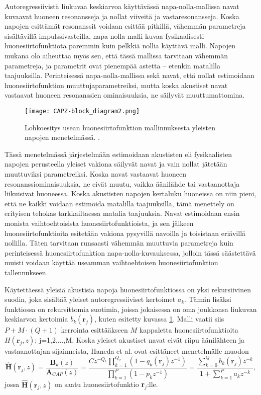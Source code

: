 \documentclass[finnish,12pt]{article}
\begin{document}
Autoregressiivistä liukuvaa keskiarvoa käyttävässä napa-nolla-mallissa navat kuvaavat huoneen resonansseja ja nollat viiveitä ja vastaresonansseja. Koska napojen esittämät resonanssit voidaan esittää pitkillä, vähemmän parametreja sisältävillä impulssivasteilla, napa-nolla-malli kuvaa fysikaalisesti huonesiirtofunktiota paremmin kuin pelkkiä nollia käyttävä malli. Napojen mukana olo aiheuttaa myös sen, että tässä mallissa tarvitaan vähemmän parametreja, ja parametrit ovat pienempää astetta -- etenkin matalilla taajuuksilla. Perinteisessä napa-nolla-mallissa sekä navat, että nollat estimoidaan huonesiirtofunktion muuttujaparametreiksi, mutta koska akustiset navat vastaavat huoneen resonanssien ominaisuuksia, ne säilyvät muuttumattomina. \cite{YHaneda1994} 

\begin{figure}[h!]
\centering
\texttt{[image: CAPZ-block\_diagram2.png]}
\caption{Lohkoesitys usean huonesiirtofunktion mallinnuksesta yleisten napojen menetelmässä. \cite{YHaneda1994}.}
\label{fig:CAPZ block diagram}
\end{figure}

Tässä menetelmässä järjestelmään estimoidaan akustisten eli fysikaalisten napojen perusteella yleiset vakiona säilyvät navat ja vain nollat jätetään muuttuviksi parametreiksi. Koska navat vastaavat huoneen resonanssiominaisuuksia, ne eivät muutu, vaikka äänilähde tai vastaanottaja liikuisivat huoneessa. Koska akustisten napojen kertaluku huoneissa on niin pieni, että ne kaikki voidaan estimoida matalilla taajuuksilla, tämä menettely on erityisen tehokas tarkkailtaessa matalia taajuuksia. Navat estimoidaan ensin monista vaihtoehtoisista huonesiirtofunktioista, ja sen jälkeen huonesiirtofunktioita esitetään vakiona pysyvillä navoilla ja toisistaan eriävillä nollilla. Täten tarvitaan runsaasti vähemmän muuttuvia parametreja kuin perinteisessä huonesiirtofunktion napa-nolla-kuvauksessa, jolloin tässä säästettävä muisti voidaan käyttää useamman vaihtoehtoisen huonesiirtofunktion tallennukseen. \cite{YHaneda1994}

Käytettäessä yleisiä akustisia napoja huonesiirtofunktiossa on yksi rekursiivinen suodin, joka sisältää yleiset autoregressiiviset kertoimet $a_k$. Tämän lisäksi funktiossa on rekursittomia suotimia, joissa jokaisessa on oma joukkonsa liukuvan keskiarvon kertoimia $b_k(\textbf{r}_j)$, kuten esitetty kuvassa \ref{fig:CAPZ block diagram}. Malli vaatii siis $P + M \cdot (Q + 1)$ kerrointa esittääkseen $M$ kappaletta huonesiirtofunktioita $H(\textbf{r}_j, z)$; j=1,2,...,M. Koska yleiset akustiset navat eivät riipu äänilähteen ja vastaanottajan sijainneista, Haneda et al. \cite{YHaneda1994} ovat esittäneet menetelmälle muodon \begin{equation}
\hat{\textbf{H}}(\textbf{r}_j,z) = \frac{\textbf{B}_k(z)}{\textbf{A}_{CAP}(z)} = \frac{ C z^{-Q_1} \prod\limits_{k=1}^{Q_2} \left( 1 - q_k(\textbf{r}_j) z^{-1} \right) }{ \prod\limits_{k=1}^P \left( 1 - p_k z^{-1} \right) } = \frac{\sum\limits_{k=0}^Q b_k(\textbf{r}_j) z^{-k} }{ 1 + \sum\limits_{k=1}^P a_k z^{-k} },
\end{equation} jossa $\hat{\textbf{H}}(\textbf{r}_j,z)$ on saatu huonesiirtofunktio \textbf{r}$_j$:lle. \cite{YHaneda1994,YHaneda1997}
\end{document}
